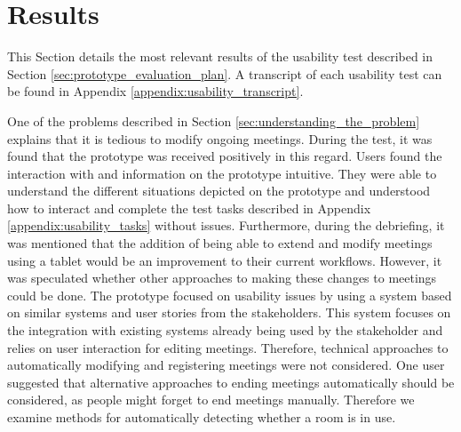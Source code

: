 \section{Results}\label{sec:usability_evaluation_results}
This Section details the most relevant results of the usability test described in Section \ref{sec:prototype_evaluation_plan}.
A transcript of each usability test can be found in Appendix \ref{appendix:usability_transcript}.

One of the problems described in Section \ref{sec:understanding_the_problem} explains that it is tedious to modify ongoing meetings. 
During the test, it was found that the prototype was received positively in this regard. 
Users found the interaction with and information on the prototype intuitive. 
They were able to understand the different situations depicted on the prototype and understood how to interact and complete the test tasks described in Appendix \ref{appendix:usability_tasks} without issues. 
Furthermore, during the debriefing, it was mentioned that the addition of being able to extend and modify meetings using a tablet would be an improvement to their current workflows.
However, it was speculated whether other approaches to making these changes to meetings could be done. 
The prototype focused on usability issues by using a system based on similar systems and user stories from the stakeholders. 
This system focuses on the integration with existing systems already being used by the stakeholder and relies on user interaction for editing meetings. 
Therefore, technical approaches to automatically modifying and registering meetings were not considered. 
One user suggested that alternative approaches to ending meetings automatically should be considered, as people might forget to end meetings manually.
Therefore we examine methods for automatically detecting whether a room is in use.


